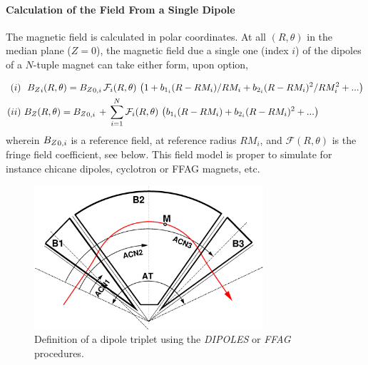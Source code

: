 \bigskip

\paragraph{Calculation of the Field From a Single Dipole} 

 \noindent The magnetic field is calculated in  polar
coordinates.  At all $(R,\theta)$ in the median plane ($Z=0$), the 
magnetic field  due  a single one (index $i$) of the  dipoles  of a $N$-tuple   magnet can 
take either form, upon option, 

\begin{eqnarray}
(i) & ~ ~ {B_Z}_i(R,\theta) =  {B_Z}_{0,i} \, \mathcal{F}_i(R,\theta) \, 
\left( 1 +  b_{1_i} (R-RM_{i})/RM_{i} + b_{2_i} (R-RM_{i})^2/RM_{i}^2 +... \right)  \label{EqFieldDipolesi} \\
 (ii) & ~   B_Z(R,\theta) =  {B_Z}_{0,i} \, + \, \sum_{i=1}^N  \mathcal{F}_i(R,\theta) \, 
\left( b_{1_i} (R-RM_{i}) + b_{2_i} (R-RM_{i})^2 +... \right)
\label{EqFieldDipolesii}
\end{eqnarray}
%
\noindent wherein ${B_Z}_{0,i}$  is a reference field, at reference radius  $RM_{i}$, 
 and $ \mathcal{F}(R,\theta)$ is the fringe field coefficient, see below. 
This field model is proper to simulate for instance chicane dipoles,  cyclotron 
 or FFAG   magnets, etc. 


\begin{figure}[h]
 \begin{center}
\includegraphics[width=8.5cm]{ffagTriplet.eps}  
 \caption{ \label{figDFD}
Definition of a dipole triplet using  the \textsl{DIPOLES} or  \textsl{FFAG}  procedures. 
}
  \end{center}
\end{figure}





